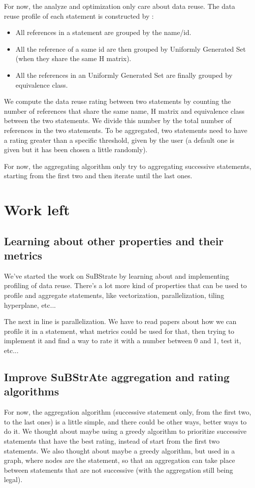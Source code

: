 \documentclass[paper=a4, fontsize=11pt]{scrartcl}
\numberwithin{equation}{section}        %
\numberwithin{figure}{section}          %
\numberwithin{table}{section}               %
\begin{document}
        For now, the analyze and optimization only care about data reuse. The data reuse
        profile of each statement is constructed by :
        \begin{itemize}
            \item All references in a statement are grouped by the name/id.
            \item All the reference of a same id are then grouped by Uniformly Generated Set
                (when they share the same H matrix).
                \item All the references in an Uniformly Generated Set are finally grouped
                    by equivalence class.
        \end{itemize}
        We compute the data reuse rating between two statements by counting the number of
        references that share the same name, H matrix and equivalence class between the
        two statements. We divide this number by the total number of references in the two
        statements. To be aggregated, two statements need to have a rating greater than a
        specific threshold, given by the user (a default one is given but it has been chosen
        a little randomly).

        For now, the aggregating algorithm only try to aggregating successive statements,
        starting from the first two and then iterate until the last ones.

\section{Work left}
    \subsection{Learning about other properties and their metrics}
        We've started the work on SuBStrate by learning about and implementing profiling of
        data reuse. There's a lot more kind of properties that can be used to profile
        and aggregate statements, like vectorization, parallelization, tiling hyperplane, etc...

        The next in line is parallelization. We have to read papers about how we can profile
        it in a statement, what metrics could be used for that, then trying to implement
        it and find a way to rate it with a number between 0 and 1, test it, etc...
    \subsection{Improve SuBStrAte aggregation and rating algorithms}
        For now, the aggregation algorithm (successive statement only, from the first two,
        to the last ones) is a little simple, and there could be other ways, better ways
        to do it. We thought about maybe using a greedy algorithm to prioritize successive
        statements that have the best rating, instead of start from the first two statements.
        We also thought about maybe a greedy algorithm, but used in a graph, where nodes
        are the statement, so that an aggregation can take place between statements that
        are not successive (with the aggregation still being legal).




\end{document}
